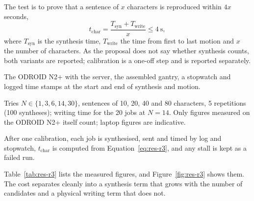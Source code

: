
            The test is to prove that a sentence of $x$ characters is reproduced within $4x$ seconds,
            \begin{equation}
            \label{eq:res-r3}
            t_{\mathrm{char}}=\frac{T_{\mathrm{syn}}+T_{\mathrm{write}}}{x}\le 4\ \mathrm{s},
            \end{equation}
            where $T_{\mathrm{syn}}$ is the synthesis time, $T_{\mathrm{write}}$ the time from first to last motion and $x$ the number of characters.
            As the proposal does not say whether synthesis counts, both variants are reported; calibration is a one-off step and is reported separately.


            The ODROID N2+ with the server, the assembled gantry, a stopwatch and logged time stamps at the start and end of synthesis and motion.


            Tries $N\in\{1,3,6,14,30\}$, sentences of 10, 20, 40 and 80 characters, 5 repetitions (100 syntheses); writing time for the 20 jobs at $N=14$.
            Only figures measured on the ODROID N2+ itself count; laptop figures are indicative.


            After one calibration, each job is synthesised, sent and timed by log and stopwatch, $t_{\mathrm{char}}$ is computed from Equation~\ref{eq:res-r3}, and any stall is kept as a failed run.


            Table~\ref{tab:res-r3} lists the measured figures, and Figure~\ref{fig:res-r3} shows them.
            The cost separates cleanly into a synthesis term that grows with the number of candidates and a physical writing term that does not.

